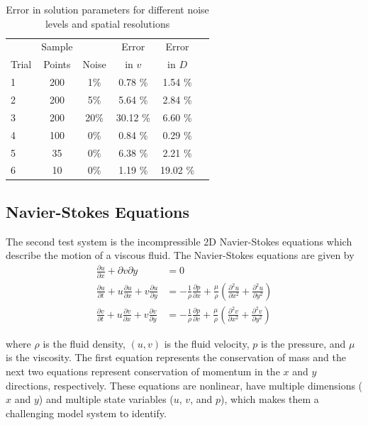 \documentclass{article}
\begin{document}
\begin{table}[t]
\caption{Error in solution parameters for different noise levels and spatial resolutions}
\label{tab:advdifresults}
\vskip 0.15in
\begin{center}
\begin{small}
\begin{sc}
\begin{tabular}{lccccr}
\toprule
 & Sample &  & Error & Error\\
Trial & Points & Noise & in $v$ & in $D$\\
\midrule
1 & 200 & 1\%  & 0.78 \% & 1.54 \% \\
2 & 200 & 5\%  & 5.64 \% & 2.84 \% \\
3 & 200 & 20\%  & 30.12 \% & 6.60 \% \\
4 & 100 & 0\%  & 0.84 \% & 0.29 \% \\
5 & 35 & 0\%  & 6.38 \% & 2.21 \% \\
6 & 10 & 0\%  & 1.19 \% & 19.02 \% \\
\bottomrule
\end{tabular}
\end{sc}
\end{small}
\end{center}
\vskip -0.1in
\end{table}


\subsection{Navier-Stokes Equations}
The second test system is the incompressible 2D Navier-Stokes equations which describe the motion of a viscous fluid. The Navier-Stokes equations are given by
\begin{align}
  \frac{\partial u}{\partial x} + \partial{v}{\partial y} &= 0 \\
  \frac{\partial u }{\partial t} + u \frac{\partial u }{\partial x} + v \frac{\partial u }{\partial y} &= - \frac{1}{\rho} \frac{\partial p}{\partial x} + \frac{\mu}{\rho}\left( \frac{\partial^2 u}{\partial x^2} + \frac{\partial^2 u}{\partial y^2} \right) \\
\frac{\partial v }{\partial t} + u \frac{\partial v }{\partial x} + v \frac{\partial v }{\partial y} &= - \frac{1}{\rho} \frac{\partial p}{\partial v} + \frac{\mu}{\rho}\left( \frac{\partial^2 v}{\partial x^2} + \frac{\partial^2 v}{\partial y^2} \right)
\end{align}

where $\rho$ is the fluid density, $(u, v)$ is the fluid velocity, $p$ is the pressure, and $\mu$ is the viscosity. The first equation represents the conservation of mass and the next two equations represent conservation of momentum in the $x$ and $y$ directions, respectively. These equations are nonlinear, have multiple dimensions ($x$ and $y$) and multiple state variables ($u$, $v$, and $p$), which makes them a challenging model system to identify.
\end{document}
